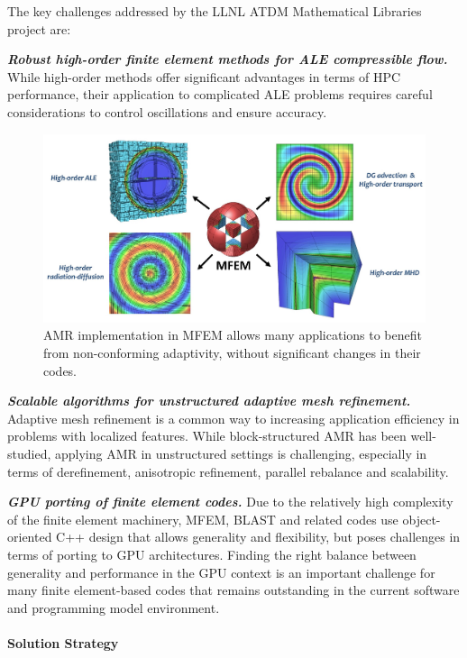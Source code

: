 The key challenges addressed by the LLNL ATDM Mathematical Libraries project are:

\noindent
{\bf \em Robust high-order finite element methods for ALE compressible flow.}
While high-order methods offer significant advantages in terms of HPC performance,
their application to complicated ALE problems requires careful considerations to
control oscillations and ensure accuracy.

\begin{figure}[htb]
\centering
\includegraphics[width=\textwidth]{projects/2.3.6-NNSA/2.3.6.02-LLNL-ATDM/mfem-amr}
\caption{\label{fig:mfem-amr}AMR implementation in MFEM allows many applications to benefit from non-conforming adaptivity, without significant changes in their codes.}
\end{figure}

\noindent
{\bf \em Scalable algorithms for unstructured adaptive mesh refinement.}
Adaptive mesh refinement is a common way to increasing application efficiency
in problems with localized features. While block-structured AMR has been
well-studied, applying AMR in unstructured settings is challenging, especially
in terms of derefinement, anisotropic refinement, parallel rebalance and
scalability.

\noindent
{\bf \em GPU porting of finite element codes.}
Due to the relatively high complexity of the finite element machinery, MFEM,
BLAST and related codes use object-oriented C++ design that allows generality
and flexibility, but poses challenges in terms of porting to GPU architectures.
Finding the right balance between generality and performance in the GPU context
is an important challenge for many finite element-based codes that remains
outstanding in the current software and programming model environment.

\paragraph{Solution Strategy}

